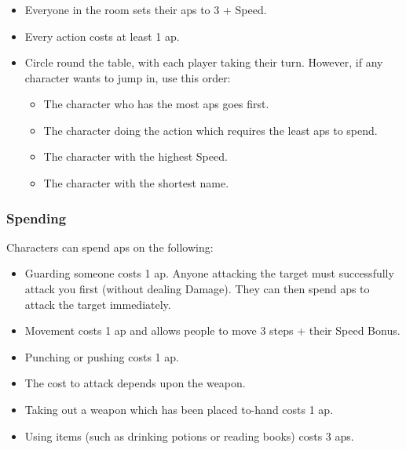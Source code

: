 \subsubsection*{}

\begin{itemize}

  \item
  Everyone in the room sets their \glspl{ap} to 3 + Speed.
  \item
  Every action costs at least 1 \gls{ap}.
  \item
  Circle round the table, with each player taking their turn.
  However, if any character wants to jump in, use this order:
  \begin{itemize}
    \item
    The character who has the most \glspl{ap} goes first.
    \item
    The character doing the action which requires the least \glspl{ap} to spend.
    \item
    The character with the highest Speed.
    \item
    The character with the shortest name.
  \end{itemize}
\end{itemize}

\subsubsection*{Spending }

Characters can spend \glspl{ap} on the following:

\begin{itemize}
  \item
  Guarding someone costs 1 \gls{ap}.
  Anyone attacking the target must successfully attack you first (without dealing Damage).
  They can then spend \glspl{ap} to attack the target immediately.
  \item
  Movement costs 1 \gls{ap} and allows people to move 3 steps + their Speed Bonus.
  \item
  Punching or pushing costs 1 \gls{ap}.
  \item
  The cost to attack depends upon the weapon.
  \item
  Taking out a weapon which has been placed to-hand costs 1 \gls{ap}.
  \item
  Using items (such as drinking potions or reading books) costs 3 \glspl{ap}.
\end{itemize}

